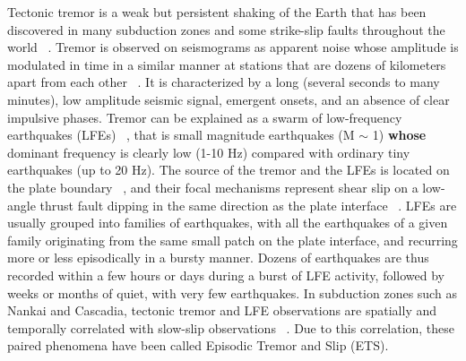 \documentclass[draft]{agujournal2019}
\begin{document}
Tectonic tremor is a weak but persistent shaking of the Earth that has been discovered in many subduction zones and some strike-slip faults throughout the world ~\cite{BER_2011}. Tremor is observed on seismograms as apparent noise whose amplitude is modulated in time in a similar manner at stations that are dozens of kilometers apart from each other ~\cite{OBA_2002}. It is characterized by a long (several seconds to many minutes), low amplitude seismic signal, emergent onsets, and an absence of clear impulsive phases. Tremor can be explained as a swarm of low-frequency earthquakes (LFEs) ~\cite{SHE_2007_nature}, that is small magnitude earthquakes (M $\sim$ 1) \textbf{whose} dominant frequency is clearly low (1-10 Hz) compared with ordinary tiny earthquakes (up to 20 Hz). The source of the tremor and the LFEs is located on the plate boundary ~\cite{SHE_2006,BOS_2012,AUD_2016}, and their focal mechanisms represent shear slip on a low-angle thrust fault dipping in the same direction as the plate interface ~\cite{IDE_2007_GRL,BOS_2012,ROY_2014}. LFEs are usually grouped into families of earthquakes, with all the earthquakes of a given family originating from the same small patch on the plate interface, and recurring more or less episodically in a bursty manner. Dozens of earthquakes are thus recorded within a few hours or days during a burst of LFE activity, followed by weeks or months of quiet, with very few earthquakes. In subduction zones such as Nankai and Cascadia, tectonic tremor and LFE observations are spatially and temporally correlated with slow-slip observations ~\cite{ROG_2003,OBA_2004}. Due to this correlation, these paired phenomena have been called Episodic Tremor and Slip (ETS). \\
\end{document}
